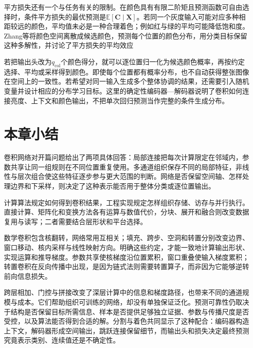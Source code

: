 平方损失还有一个与任务有关的限制。在颜色具有有限二阶矩且预测函数可自由选择时，条件平方损失的最优预测是$\mathbb E[\bm C\mid\bm X]$。若同一个灰度输入可能对应多种相距较远的颜色，平均值未必是一种合理着色；例如红与绿的平均可能降低饱和度。Zhang等将颜色空间离散成候选颜色，预测每个位置的颜色分布，用分类目标保留这种多解性，并讨论了平方损失的平均效应

若把输出头改为$q_{\mathrm{col}}$个颜色得分，就可以逐位置归一化为候选颜色概率，再按约定选择、平均或采样得到颜色。即使每个位置都有概率分布，也不自动获得整张图像在空间上的一致性。若希望对同一输入生成多个整体协调的结果，还需要引入随机变量并设计相应的分布学习目标。这里的确定性编码器—解码器说明了卷积如何连接亮度、上下文和颜色输出，不把单次回归预测当作完整的条件生成分布。

\section{本章小结}
\label{sec:cnn-summary}

卷积网络对开篇问题给出了两项具体回答：局部连接把每次计算限定在邻域内，参数共享让同一组规则在不同位置重复使用。多通道组织保存不同的局部特征，非线性与层次组合使这些特征逐步参与更大范围的判断。网络是否保留空间轴、怎样处理边界和下采样，则决定了这种表示能否用于整体分类或逐位置输出。

计算算法规定如何得到卷积结果，工程实现规定怎样组织存储、访存与并行执行。直接计算、矩阵化和变换方法各有运算与数值代价，分块、展开和融合则改变数据复用与读写；二者需要结合层形状和平台选择。

数学卷积包含核翻转，网络常用互相关；填充、跨步、空洞和转置分别改变边界、窗口移动、核内采样与线性映射方向。明确这些约定，才能一致地计算输出形状、实现运算和推导梯度。参数共享使核梯度沿位置累积，窗口重叠使输入梯度累积；转置卷积在反向传播中出现，是因为链式法则需要转置算子，而非因为它能够逆转前向信息损失。

跨层相加、门控与拼接改变了深层计算中的信息和梯度路径，也带来不同的通道规模与成本。它们帮助组织可训练的网络，却没有单独保证泛化。预测可靠性仍取决于结构是否保留目标所需信息、样本是否提供足够独立证据、参数与传播尺度是否受控，以及算法能否得到合适的解。分割与着色共同显示了这种配合：编码器构造上下文，解码器形成空间输出，跳跃连接保留细节，而输出头和损失决定最终预测究竟表示类别、连续值还是不确定性。
